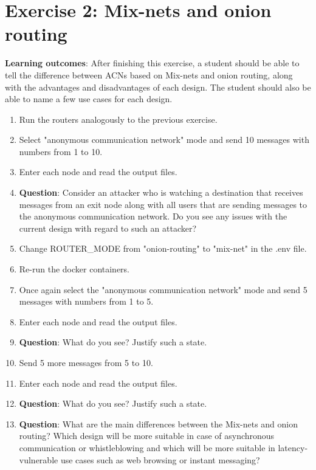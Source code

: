 \section*{Exercise 2: Mix-nets and onion routing}
\textbf{Learning outcomes}: After finishing this exercise, a student should be able to tell the difference between ACNs based on Mix-nets and onion routing, along with the advantages and disadvantages of each design. The student should also be able to name a few use cases for each design.
\begin{enumerate}
    \item Run the routers analogously to the previous exercise.
    \item Select "anonymous communication network" mode and send 10 messages with numbers from 1 to 10.
    \item Enter each node and read the output files.
    \item \textbf{Question}: Consider an attacker who is watching a destination that receives messages from an exit node along with all users that are sending messages to the anonymous communication network. Do you see any issues with the current design with regard to such an attacker?
    \item Change ROUTER\_MODE from "onion-routing" to "mix-net" in the .env file.
    \item Re-run the docker containers.
    \item Once again select the "anonymous communication network" mode and send 5 messages with numbers from 1 to 5.
    \item Enter each node and read the output files.
    \item \textbf{Question}: What do you see? Justify such a state.
    \item Send 5 more messages from 5 to 10.
    \item Enter each node and read the output files.
    \item \textbf{Question}: What do you see? Justify such a state.
    \item \textbf{Question}: What are the main differences between the Mix-nets and onion routing? Which design will be more suitable in case of asynchronous communication or whistleblowing and which will be more suitable in latency-vulnerable use cases such as web browsing or instant messaging?
\end{enumerate}

